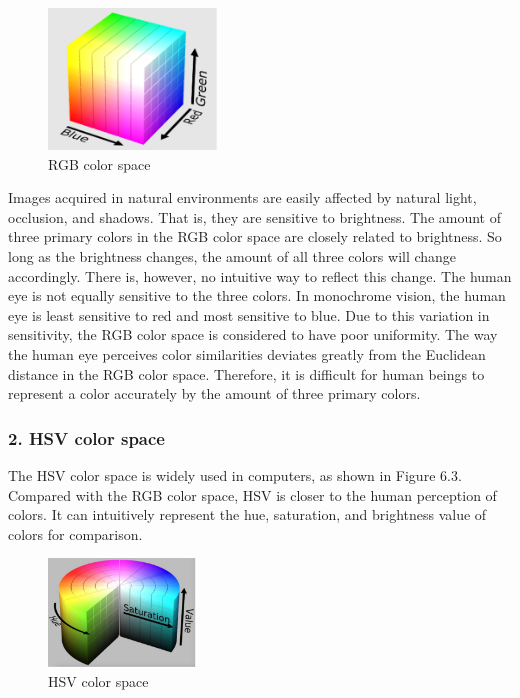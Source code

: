 \documentclass[a4paper,12pt,openany]{book}
\begin{document}
\begin{figure}[h!]
    \centering
    \includegraphics[width=0.4\textwidth]{D6Z/6-2}
    \caption{RGB color space}
\end{figure}

Images acquired in natural environments are easily affected by natural light, occlusion, and shadows. That is, they are sensitive to brightness. The amount of three primary colors in the RGB color space are closely related to brightness. So long as the brightness changes, the amount of all three colors will change accordingly. There is, however, no intuitive way to reflect this change. The human eye is not equally sensitive to the three colors. In monochrome vision, the human eye is least sensitive to red and most sensitive to blue. Due to this variation in sensitivity, the RGB color space is considered to have poor uniformity. The way the human eye perceives color similarities deviates greatly from the Euclidean distance in the RGB color space. Therefore, it is difficult for human beings to represent a color accurately by the amount of three primary colors.

\subsubsection{2. HSV color space}
The HSV color space is widely used in computers, as shown in Figure 6.3. Compared with the RGB color space, HSV is closer to the human perception of colors. It can intuitively represent the hue, saturation, and brightness value of colors for comparison.

\begin{figure}[h!]
    \centering
    \includegraphics[width=0.35\textwidth]{D6Z/6-3}
    \caption{HSV color space}
\end{figure}
\end{document}
